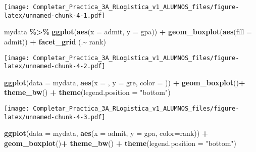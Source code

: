 \documentclass[
]{article}
\newenvironment{Shaded}{\begin{snugshade}}{\end{snugshade}}
\newcommand{\AttributeTok}[1]{\textcolor[rgb]{0.13,0.29,0.53}{#1}}
\newcommand{\FunctionTok}[1]{\textcolor[rgb]{0.13,0.29,0.53}{\textbf{#1}}}
\newcommand{\NormalTok}[1]{#1}
\newcommand{\SpecialCharTok}[1]{\textcolor[rgb]{0.81,0.36,0.00}{\textbf{#1}}}
\newcommand{\StringTok}[1]{\textcolor[rgb]{0.31,0.60,0.02}{#1}}
\begin{document}
\texttt{[image: Completar\_Practica\_3A\_RLogistica\_v1\_ALUMNOS\_files/figure-latex/unnamed-chunk-4-1.pdf]}

\begin{Shaded}
\begin{Highlighting}[]
\NormalTok{mydata }\SpecialCharTok{\%\textgreater{}\%}
  \FunctionTok{ggplot}\NormalTok{(}\FunctionTok{aes}\NormalTok{(}\AttributeTok{x =}\NormalTok{ admit, }\AttributeTok{y =}\NormalTok{ gpa)) }\SpecialCharTok{+}
  \FunctionTok{geom\_boxplot}\NormalTok{(}\FunctionTok{aes}\NormalTok{(}\AttributeTok{fill =}\NormalTok{ admit)) }\SpecialCharTok{+}
  \FunctionTok{facet\_grid}\NormalTok{ (.}\SpecialCharTok{\textasciitilde{}}\NormalTok{ rank)}
\end{Highlighting}
\end{Shaded}

\texttt{[image: Completar\_Practica\_3A\_RLogistica\_v1\_ALUMNOS\_files/figure-latex/unnamed-chunk-4-2.pdf]}

\begin{Shaded}
\begin{Highlighting}[]
\FunctionTok{ggplot}\NormalTok{(}\AttributeTok{data =}\NormalTok{ mydata, }\FunctionTok{aes}\NormalTok{(}\AttributeTok{x =}\NormalTok{ , }\AttributeTok{y =}\NormalTok{ gre, }\AttributeTok{color =}\NormalTok{ )) }\SpecialCharTok{+}
  \FunctionTok{geom\_boxplot}\NormalTok{()}\SpecialCharTok{+}
  \FunctionTok{theme\_bw}\NormalTok{() }\SpecialCharTok{+}
  \FunctionTok{theme}\NormalTok{(}\AttributeTok{legend.position =} \StringTok{"bottom"}\NormalTok{)}
\end{Highlighting}
\end{Shaded}

\texttt{[image: Completar\_Practica\_3A\_RLogistica\_v1\_ALUMNOS\_files/figure-latex/unnamed-chunk-4-3.pdf]}

\begin{Shaded}
\begin{Highlighting}[]
\FunctionTok{ggplot}\NormalTok{(}\AttributeTok{data =}\NormalTok{ mydata, }\FunctionTok{aes}\NormalTok{(}\AttributeTok{x =}\NormalTok{ admit, }\AttributeTok{y =}\NormalTok{ gpa, }\AttributeTok{color=}\NormalTok{rank)) }\SpecialCharTok{+}
  \FunctionTok{geom\_boxplot}\NormalTok{()}\SpecialCharTok{+}
  \FunctionTok{theme\_bw}\NormalTok{() }\SpecialCharTok{+}
  \FunctionTok{theme}\NormalTok{(}\AttributeTok{legend.position =} \StringTok{"bottom"}\NormalTok{)}
\end{Highlighting}
\end{Shaded}
\end{document}
